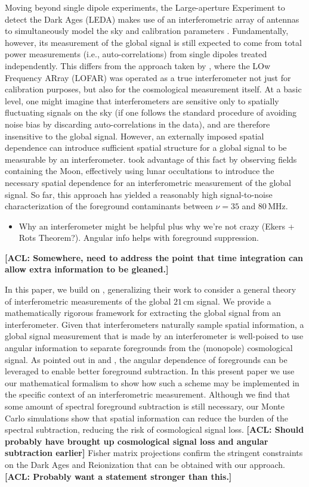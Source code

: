 \documentclass[twolcolumn,apj,iop,numberedappendix]{emulateapj}
\newcommand{\acl}[1]{{\color{red} \textbf{[ACL:  #1]}}}
\begin{document}
Moving beyond single dipole experiments, the Large-aperture Experiment to detect the Dark Ages (LEDA) makes use of an interferometric array of antennas to simultaneously model the sky and calibration parameters \citep{BernardiLEDA}.  Fundamentally, however, its measurement of the global signal is still expected to come from total power measurements (i.e., auto-correlations) from single dipoles treated independently.  This differs from the approach taken by \citet{VedanthamLOFAR2}, where the LOw Frequency ARray (LOFAR) was operated as a true interferometer not just for calibration purposes, but also for the cosmological measurement itself.  At a basic level, one might imagine that interferometers are sensitive only to spatially fluctuating signals on the sky (if one follows the standard procedure of avoiding noise bias by discarding auto-correlations in the data), and are therefore insensitive to the global signal.  However, an externally imposed spatial dependence can introduce sufficient spatial structure for a global signal to be measurable by an interferometer.  \citet{VedanthamLOFAR2} took advantage of this fact by observing fields containing the Moon, effectively using lunar occultations to introduce the necessary spatial dependence for an interferometric measurement of the global signal.  So far, this approach has yielded a reasonably high signal-to-noise characterization of the foreground contaminants between $\nu =35$ and $80\,\textrm{MHz}$.

\begin{itemize}
\item Why an interferometer might be helpful plus why we're not crazy (Ekers + Rots Theorem?).  Angular info helps with foreground suppression.
\end{itemize}
\acl{Somewhere, need to address the point that time integration can allow extra information to be gleaned.}

In this paper, we build on \citet{VedanthamLOFAR2}, generalizing their work to consider a general theory of interferometric measurements of the global $21\,\textrm{cm}$ signal.  We provide a mathematically rigorous framework for extracting the global signal from an interferometer.  Given that interferometers naturally sample spatial information, a global signal measurement that is made by an interferometer is well-poised to use angular information to separate foregrounds from the (monopole) cosmological signal.  As pointed out in \citep{L13} and \citep{Liu_Switzer_2014}, the angular dependence of foregrounds can be leveraged to enable better foreground subtraction.  In this present paper we use our mathematical formalism to show how such a scheme may be implemented in the specific context of an interferometric measurement.  Although we find that some amount of spectral foreground subtraction is still necessary, our Monte Carlo simulations show that spatial information can reduce the burden of the spectral subtraction, reducing the risk of cosmological signal loss.  \acl{Should probably have brought up cosmological signal loss and angular subtraction earlier}  Fisher matrix projections confirm the stringent constraints on the Dark Ages and Reionization that can be obtained with our approach.  \acl{Probably want a statement stronger than this.}
\end{document}
